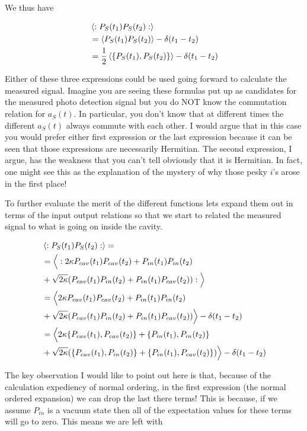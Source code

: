 \documentclass[12pt]{article}
\begin{document}
We thus have

\begin{align}
&\Braket{:P_S(t_1)P_S(t_2) :}\\
&=\Braket{P_S(t_1)P_S(t_2)} - \delta(t_1-t_2)\\
&=\frac{1}{2} \Braket{\{P_S(t_1),P_S(t_2)\}} - \delta(t_1-t_2)
\end{align}

Either of these three expressions could be used going forward to calculate the measured signal. Imagine you are seeing these formulas put up as candidates for the measured photo detection signal but you do NOT know the commutation relation for $a_S(t)$. In particular, you don't know that at different times the different $a_S(t)$ always commute with each other. I would argue that in this case you would prefer either first expression or the last expression because it can be seen that those expressions are necessarily Hermitian. The second expression, I argue, has the weakness that you can't tell obviously that it is Hermitian. In fact, one might see this as the explanation of the mystery of why those pesky $i$'s arose in the first place!

To further evaluate the merit of the different functions lets expand them out in terms of the input output relations so that we start to related the measured signal to what is going on inside the cavity.

\begin{align}
&\Braket{:P_S(t_1)P_S(t_2):} = \\
&= \Big\langle :2\kappa P_{cav}(t_1)P_{cav}(t_2) + P_{in}(t_1)P_{in}(t_2)\\
&+\sqrt{2\kappa}(P_{cav}(t_1) P_{in}(t_2) + P_{in}(t_1)P_{cav}(t_2)) :\Big \rangle\\
&= \Big \langle2\kappa P_{cav}(t_1)P_{cav}(t_2) + P_{in}(t_1)P_{in}(t_2) \\
&+ \sqrt{2\kappa}(P_{cav}(t_1) P_{in}(t_2) + P_{in}(t_1)P_{cav}(t_2))\Big \rangle  - \delta(t_1-t_2)\\
&= \Big\langle 2\kappa \{P_{cav}(t_1),P_{cav}(t_2)\}  + \{P_{in}(t_1),P_{in}(t_2)\}\\
&+ \sqrt{2\kappa}(\{P_{cav}(t_1), P_{in}(t_2)\} + \{P_{in}(t_1),P_{cav}(t_2)\})\Big\rangle - \delta(t_1-t_2)
\end{align}

The key observation I would like to point out here is that, because of the calculation expediency of normal ordering, in the first expression (the normal ordered expansion) we can drop the last there terms! This is because, if we assume $P_{in}$ is a vacuum state then all of the expectation values for these terms will go to zero. This means we are left with
\end{document}
